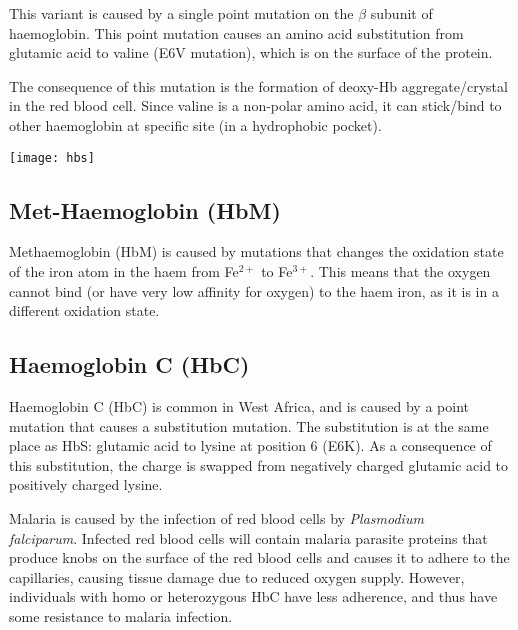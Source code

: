 This variant is caused by a single point mutation on the $\beta$ subunit of haemoglobin.
This point mutation causes an amino acid substitution from glutamic acid to valine (E6V mutation), which is on the surface of the protein.

The consequence of this mutation is the formation of deoxy-Hb aggregate/crystal in the red blood cell.
Since valine is a non-polar amino acid, it can stick/bind to other haemoglobin at specific site (in a hydrophobic pocket).

\begin{center}
\texttt{[image: hbs]}
\end{center}

\subsection{Met-Haemoglobin (HbM)}

Methaemoglobin (HbM) is caused by mutations that changes the oxidation state of the iron atom in the haem from Fe$^{2+}$ to Fe$^{3+}$.
This means that the oxygen cannot bind (or have very low affinity for oxygen) to the haem iron, as it is in a different oxidation state.

\subsection{Haemoglobin C (HbC)}

Haemoglobin C (HbC) is common in West Africa, and is caused by a point mutation that causes a substitution mutation.
The substitution is at the same place as HbS: glutamic acid to lysine at position 6 (E6K).
As a consequence of this substitution, the charge is swapped from negatively charged glutamic acid to positively charged lysine.

Malaria is caused by the infection of red blood cells by \textit{Plasmodium \\falciparum}.
Infected red blood cells will contain malaria parasite proteins that produce knobs on the surface of the red blood cells and causes it to adhere to the capillaries, causing tissue damage due to reduced oxygen supply.
However, individuals with homo or heterozygous HbC have less adherence, and thus have some resistance to malaria infection.





